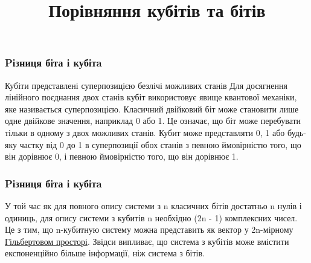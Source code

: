 \documentclass{beamer}
\begin{document}
\title{Порівняння кубітів та бітів}
\begin{frame}
\frametitle{Pізниця біта і  кубітa}
Кубіти представлені суперпозицією безлічі можливих станів
Для досягнення лінійного поєднання двох станів кубіт використовує явище квантової механіки, яке називається суперпозицією. Класичний двійковий біт може становити лише одне двійкове значення, наприклад 0 або 1. Це означає, що біт може перебувати тільки в одному з двох можливих станів. Кубит може представляти 0, 1 або будь-яку частку від 0 до 1 в суперпозиції обох станів з певною ймовірністю того, що він дорівнює 0, і певною ймовірністю того, що він дорівнює 1.
\end{frame}
\usebackgroundtemplate{}
\begin{frame}
\frametitle{Pізниця біта і  кубітa}
У той час як для повного опису системи з n класичних бітів достатньо n нулів і одиниць, для опису системи з кубитів n необхідно (2n - 1) комплексних чисел. Це з тим, що n-кубитную систему можна представить як вектор у 2n-мірному \href{https://en.wikipedia.org/wiki/Hilbert_space}{Гільбертовом просторі}. Звідси випливає, що система з кубітів може вмістити експоненційно більше інформації, ніж система з бітів.

\end{frame}
\end{document}
